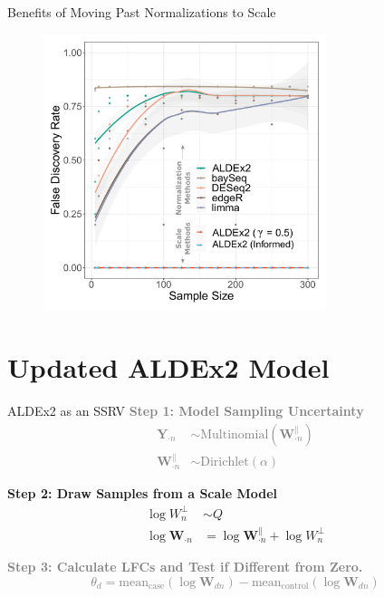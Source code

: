 \documentclass[
  ignorenonframetext,
]{beamer}
\begin{document}
\begin{frame}{Benefits of Moving Past Normalizations to Scale}
\protect\hypertarget{benefits-of-moving-past-normalizations-to-scale}{}
\begin{figure}
  \centering
  \includegraphics[width=3.25in]{figures/sim-res-samples.pdf}
\end{figure}
\end{frame}

\hypertarget{updated-aldex2-model}{%
\section{Updated ALDEx2 Model}\label{updated-aldex2-model}}

\begin{frame}{ALDEx2 as an SSRV}
\protect\hypertarget{aldex2-as-an-ssrv-1}{}
\textcolor{gray}{\textbf{Step 1: Model Sampling Uncertainty}}
\textcolor{gray}{\begin{align*}
\mathbf{Y}_{\cdot n} &\sim \text{Multinomial}(\mathbf{W}_{\cdot n}^\parallel)\\
\mathbf{W}_{\cdot n}^\parallel &\sim \text{Dirichlet}(\alpha)
\end{align*}}

\textbf{Step 2: Draw Samples from a Scale Model} \begin{align*}
\log W_{n}^\perp &\sim Q\\
\log \mathbf{W}_{\cdot n} &= \log \mathbf{W}_{\cdot n}^\parallel + \log W_{n}^\perp
\end{align*}

\textcolor{gray}{\textbf{Step 3: Calculate LFCs and Test if Different from Zero.}}
\textcolor{gray}{\begin{equation*}
\theta_d = \text{mean}_{\text{case}}(\log \mathbf{W}_{dn}) - \text{mean}_{\text{control}}(\log \mathbf{W}_{dn})
  \end{equation*}}
\end{frame}
\end{document}
